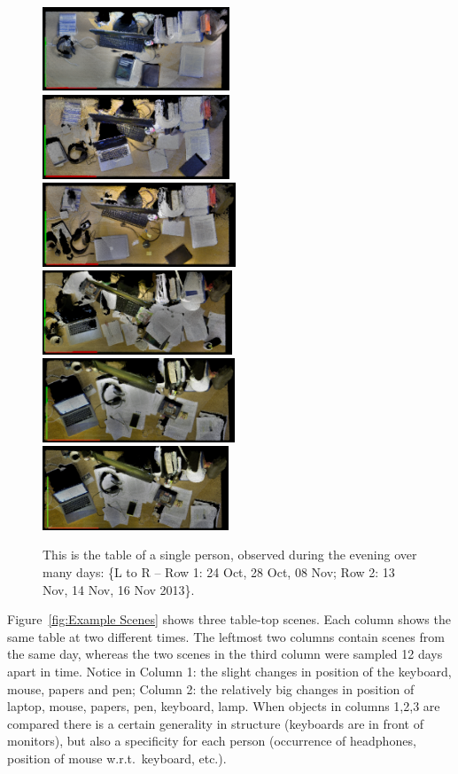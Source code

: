 \documentclass[letterpaper, 10 pt, conference]{ieeeconf}
\begin{document}
\begin{figure}[bhtp]
\begin{center}
\includegraphics[height=2.5cm]{131024} \smallskip
\includegraphics[height=2.5cm]{131028} \smallskip
\includegraphics[height=2.5cm]{131108} \\
\includegraphics[height=2.5cm]{131113} \smallskip
\includegraphics[height=2.5cm]{131114} \smallskip
\includegraphics[height=2.5cm]{131116} 
\caption{This is the table of a single person, observed during the evening over many days: \{L to R -- Row 1: 24 Oct, 28 Oct, 08 Nov; Row 2: 13 Nov, 14 Nov, 16 Nov 2013\}. }
\label{fig:Variation_Over_Days}
\end{center}
\end{figure}

Figure~\ref{fig:Example Scenes} shows three table-top scenes. Each column shows the same table at two different times. The leftmost two columns 
contain scenes from the same day, whereas the two scenes in the third column were sampled 12 days apart in time. Notice in Column 1: the slight changes in 
position of the keyboard, mouse, papers and pen; Column 2: the relatively big changes in position of laptop, mouse, papers, pen, keyboard, 
lamp. When objects in columns 1,2,3 are compared there is a certain generality in structure (keyboards are in front of monitors), but 
also a specificity for each person (occurrence of headphones, position of mouse w.r.t.\ keyboard, etc.). 
\end{document}
